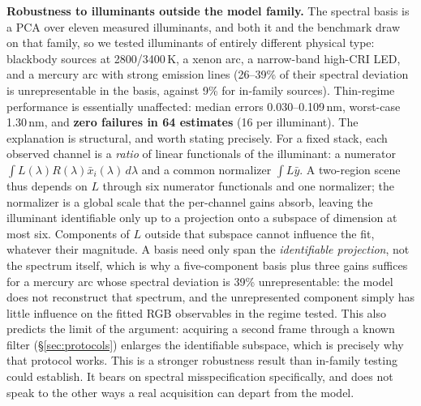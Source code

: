 \documentclass[10pt]{article}
\begin{document}
\textbf{Robustness to illuminants outside the model family.} The spectral basis is a PCA over eleven measured illuminants, and both it and the benchmark draw on that family, so we tested illuminants of entirely different physical type: blackbody sources at 2800/3400\,K, a xenon arc, a narrow-band high-CRI LED, and a mercury arc with strong emission lines (26--39\% of their spectral deviation is unrepresentable in the basis, against 9\% for in-family sources). Thin-regime performance is essentially unaffected: median errors 0.030--0.109\,nm, worst-case 1.30\,nm, and \textbf{zero failures in 64 estimates} (16 per illuminant). The explanation is structural, and worth stating precisely. For a fixed stack, each observed channel is a \emph{ratio} of linear functionals of the illuminant: a numerator $\int L(\lambda)R(\lambda)\bar{x}_i(\lambda)\,d\lambda$ and a common normalizer $\int L\bar{y}$. A two-region scene thus depends on $L$ through six numerator functionals and one normalizer; the normalizer is a global scale that the per-channel gains absorb, leaving the illuminant identifiable only up to a projection onto a subspace of dimension at most six. Components of $L$ outside that subspace cannot influence the fit, whatever their magnitude. A basis need only span the \emph{identifiable projection}, not the spectrum itself, which is why a five-component basis plus three gains suffices for a mercury arc whose spectral deviation is 39\% unrepresentable: the model does not reconstruct that spectrum, and the unrepresented component simply has little influence on the fitted RGB observables in the regime tested. This also predicts the limit of the argument: acquiring a second frame through a known filter (\S\ref{sec:protocols}) enlarges the identifiable subspace, which is precisely why that protocol works. This is a stronger robustness result than in-family testing could establish. It bears on spectral misspecification specifically, and does not speak to the other ways a real acquisition can depart from the model.
\end{document}
